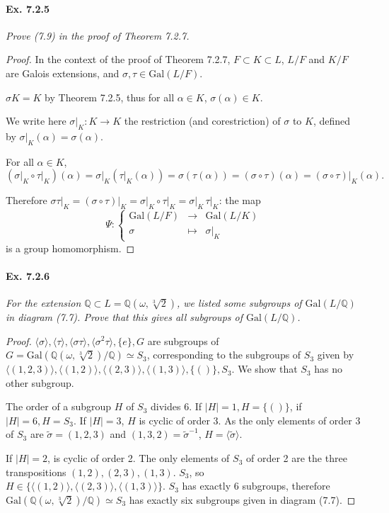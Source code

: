 \documentclass[11pt,a4paper]{article}
\newcommand{\Q}{\mathbb{Q}}
\newcommand{\Gal}{\mathrm{Gal}}
\begin{document}
\paragraph{Ex. 7.2.5}

{\it Prove (7.9) in the proof of Theorem 7.2.7.
}

\begin{proof}
In the context of the proof of Theorem 7.2.7, $F \subset K \subset L$, $L/F$ and $K/F$ are Galois extensions, and $\sigma, \tau \in \Gal(L/F)$.

$\sigma K = K$ by Theorem 7.2.5, thus for all $\alpha \in K$, $\sigma(\alpha)  \in K$.

We write here $\sigma\vert_K : K \to K$ the restriction (and corestriction) of $\sigma$ to $K$, defined by $\sigma\vert_K(\alpha) = \sigma(\alpha)$. 

For all $\alpha \in K$, 
$$(\sigma\vert_{K} \circ \tau\vert_{K})(\alpha) =\sigma\vert_K( \tau\vert_K(\alpha))  = \sigma(\tau(\alpha)) =(\sigma \circ \tau)(\alpha) =( \sigma\circ \tau)\vert_K(\alpha) .$$

Therefore $\sigma \tau \vert_K = (\sigma \circ \tau)\vert_K = \sigma\vert_K \circ \tau\vert_K = \sigma\vert_K\, \tau \vert_K$: the map
$$\Psi :
\left\{
\begin{array}{ccc}
 \Gal(L/F) &   \to &  \Gal(L/K) \\
 \sigma & \mapsto  &   \sigma\vert_K   
\end{array}
\right.
$$
is a group homomorphism.
\end{proof}

\paragraph{Ex. 7.2.6}

{\it For the extension $\Q\subset L = \Q(\omega,\sqrt[3]{2})$, we listed some subgroups of $\Gal(L/\Q)$ in diagram (7.7). Prove that this gives all subgroups of $\Gal(L/\Q)$.
}

\begin{proof}
 $\langle \sigma \rangle, \langle \tau \rangle,\langle \sigma \tau \rangle, \langle \sigma^2 \tau \rangle, \{e\}, G$ are subgroups of $G=\Gal(\Q(\omega,\sqrt[3]{2})/\Q) \simeq S_3$, corresponding to the subgroups of $S_3$ given by $\langle(1,2,3)\rangle,\langle(1,2)\rangle,\langle(2,3)\rangle,\langle(1,3)\rangle,\{()\}, S_3$. We show that $S_3$ has no other subgroup.
 
The order of a subgroup $H$ of $S_3$ divides 6. If $\vert H \vert = 1, H = \{()\}$, if $\vert H \vert = 6, H = S_3$. If $\vert H \vert = 3$, $H$ is cyclic of order 3. 
As the only elements of order 3 of $S_3$ are $\tilde{\sigma} = (1,2,3)$ and $(1,3,2) = \tilde{\sigma}^{-1}$, $H =\langle \tilde{\sigma} \rangle$.
 
If $\vert H \vert = 2$, is  cyclic of order 2. The only elements of $S_3$ of order 2 are the three transpositions $(1,2),(2,3),(1,3)$. $S_3$, so $H \in \{\langle(1,2)\rangle,\langle(2,3)\rangle,\langle(1,3)\rangle\}$. $S_3$ has exactly 6 subgroups, therefore  $\Gal(\Q(\omega,\sqrt[3]{2})/\Q) \simeq S_3$ has exactly six subgroups given in diagram (7.7).
\end{proof}
\end{document}
